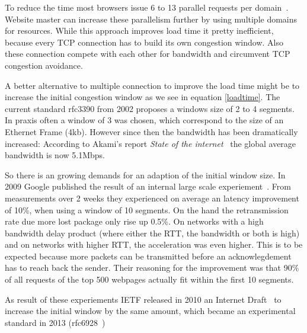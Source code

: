 To reduce the time most browsers issue 6 to 13 parallel requests per
domain~\cite{browserscope}. Website master can increase these parallelism
further by using multiple domains for resources. While this approach improves
load time it pretty inefficient, because every TCP connection has to build its
own congestion window. Also these connection compete with each other for
bandwidth and circumvent TCP congestion avoidance.

A better alternative to multiple connection to improve the load time might be to
increase the initial congestion window as we see in equation \ref{loadtime}. The
current standard rfc3390 from 2002 proposes a windows size of 2 to 4 segments.
In praxis often a window of 3 was chosen, which correspond to the size of an
Ethernet Frame (4kb). However since then the bandwidth has been dramatically
increased: According to Akami's report \emph{State of the
internet}~\cite{q3-2015-soti-connectivity-final} the global average bandwidth is
now 5.1Mbps.

So there is an growing demands for an adaption of the initial window size. In
2009 Google published the result of an internal large scale
experiement~\cite{36640}. From measurements over 2 weeks they experienced on
average an latency improvement of 10\%, when using a window of 10 segments. On
the hand the retransmission rate due more lost package only rise up 0.5\%. On
networks with a high bandwidth delay product (where either the RTT, the
bandwidth or both is high) and on networks with higher RTT, the acceleration was
even higher. This is to be expected because more packets can be transmitted
before an acknowlegdement has to reach back the sender. Their reasoning for the
improvement was that 90\% of all requests of the top 500 webpages actually fit
within the first 10 segments.

As result of these experiements IETF released in 2010 an Internet
Draft~\cite{draft-ietf-tcpm-initcwnd-00} to increase the initial window by the
same amount, which became an experimental standard in 2013
(rfc6928~\cite{rfc6928})
